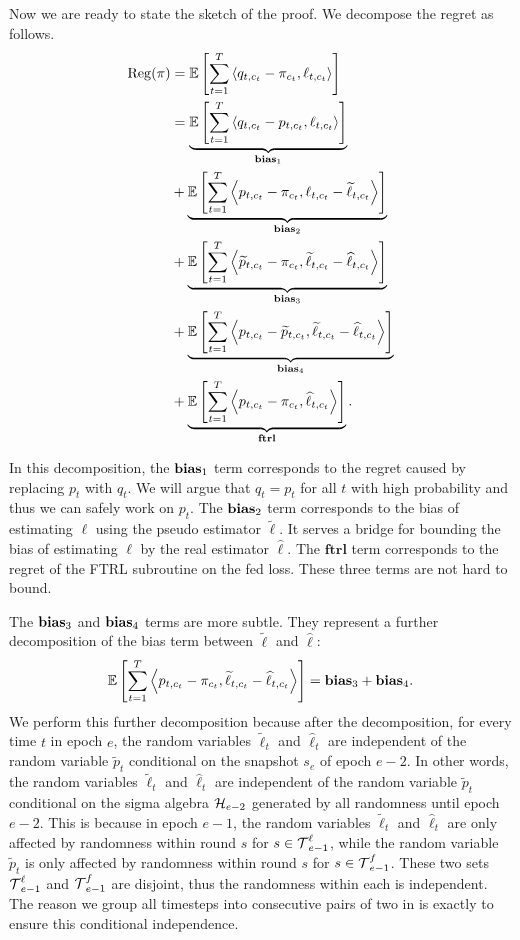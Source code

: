 Now we are ready to state the sketch of the proof. We decompose the regret as follows.
\begin{align*}
\operatorname{\mathrm{Reg}}(\pi) &= \mathbb{E}\left[\sum_{t=1}^T \left\langle q_{t, c_t}- \pi_{c_t}, \ell_{t, c_t} \right\rangle\right] \\
&=  \underbrace{\mathbb{E}\left[\sum_{t=1}^T \left\langle q_{t, c_t} - p_{t, c_t}, \ell_{t, c_t} \right\rangle\right]}_{\mathbf{bias}_{1}} \\
&+ \underbrace{\mathbb{E}\left[\sum_{t=1}^T \left\langle p_{t, c_t}- \pi_{c_t}, \ell_{t, c_t}-\widetilde{\ell}_{t, c_t} \right\rangle\right]}_{\mathbf{bias}_{2}} \\
& +\underbrace{\mathbb{E}\left[\sum_{t=1}^T \left\langle \widetilde{p}_{t, c_t}-\pi_{c_t}, \widetilde{\ell}_{t, c_t}-\widehat{\ell}_{t, c_t} \right\rangle\right]}_{\mathbf{bias}_{3}} \\
& +\underbrace{\mathbb{E}\left[\sum_{t=1}^T\left\langle  p_{t, c_t}-\widetilde{p}_{t, c_t}, \widetilde{\ell}_{t, c_t}-\widehat{\ell}_{t, c_t} \right\rangle\right]}_{\mathbf{bias}_{4}}\\
& +\underbrace{\mathbb{E}\left[\sum_{t=1}^T\left\langle  p_{t, c_t}-\pi_{c_t}, \widehat{\ell}_{t, c_t} \right\rangle\right]}_{\mathbf{ftrl}}.
\end{align*}

In this decomposition, the $\mathbf{bias}_{1}$ term corresponds to the regret caused by replacing $p_t$ with $q_t$. We will argue that $q_t = p_t$ for all $t$ with high probability and thus we can safely work on $p_t$. 
%
The $\mathbf{bias}_{2}$ term  corresponds to the bias of estimating $\ell$ using the pseudo estimator $\widetilde{\ell}$. It serves a bridge for bounding the bias of estimating $\ell$ by the real estimator $\widehat{\ell}$. The $\mathbf{ftrl}$ term corresponds to the regret of the FTRL subroutine on the fed loss. These three terms are not hard to bound.

%
The $\mathbf{bias}_{3}$ and $\mathbf{bias}_{4}$ terms are more subtle.
They represent a further decomposition of the bias term between $\widetilde{\ell}$ and $\widehat{\ell}$:
\[\mathbb{E}\left[\sum_{t=1}^T \left\langle p_{t, c_t}- \pi_{c_t}, \widetilde{\ell}_{t, c_t}-\widehat{\ell}_{t, c_t} \right\rangle\right] = \mathbf{bias}_{3}+\mathbf{bias}_{4}.\]
%
We perform this further decomposition because after the decomposition, for every time $t$ in epoch $e$, the random variables $\widetilde{\ell}_t$ and $\widehat{\ell}_t$ are independent of the random variable $\widetilde{p}_t$ conditional on the snapshot $s_{e}$ of epoch $e-2$.
%
In other words, the random variables $\widetilde{\ell}_t$ and $\widehat{\ell}_t$ are independent of the random variable $\widetilde{p}_t$ conditional on the sigma algebra $\operatorname{\mathcal{H}}_{e-2}$ generated by all randomness until  epoch $e-2$.
%
This is because in epoch $e-1$, the random variables $\widetilde{\ell}_t$ and $\widehat{\ell}_t$ are only affected by randomness within round $s$ for $s \in \operatorname{\mathcal{T}}_{e-1}^{\ell}$, while the random variable $\widetilde{p}_t$  is only affected by randomness within round $s$ for $s \in \operatorname{\mathcal{T}}_{e-1}^{f}$.
These two sets $ \operatorname{\mathcal{T}}_{e-1}^{\ell}$ and $\operatorname{\mathcal{T}}_{e-1}^{f}$ are disjoint, thus the randomness within each is independent.
%
The reason  we group all timesteps into consecutive pairs of two in  is exactly to ensure this conditional independence. 

